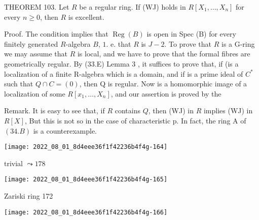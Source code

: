 THEOREM 103. Let $R$ be a regular ring. If (WJ) holds in $R\left[X_{1}, \ldots, X_{n}\right]$ for every $n \geqslant 0$, then $R$ is excellent.

Proof. The condition implies that $\operatorname{Reg}(B)$ is open in Spec (B) for every finitely generated $R$-algebra $B$, $1 .$ e. that $R$ is $J-2$. To prove that $R$ is a G-ring we may assume that $R$ is local, and we have to prove that the formal fibres are geometrically regular. By (33.E) Lemma 3 , it suffices to prove that, if (is a localization of a finite R-algebra which is a domain, and if is a prime ideal of $C^{*}$ such that $Q \cap C=(0)$, then Q is regular. Now is a homomorphic image of a localization of some $R\left[x_{1}, \ldots, X_{n}\right]$, and our assertion is proved by the

Remark. It is easy to see that, if $R$ contains $Q$, then (WJ) in $R$ implies (WJ) in $R[X]$, But this is not so in the case of characteristic p. In fact, the ring A of $(34 . B)$ is a counterexample.







\texttt{[image: 2022\_08\_01\_8d4eee36f1f42236b4f4g-164]}

trivial $\leadsto 178$

\texttt{[image: 2022\_08\_01\_8d4eee36f1f42236b4f4g-165]}

Zariski ring 172

\texttt{[image: 2022\_08\_01\_8d4eee36f1f42236b4f4g-166]}



